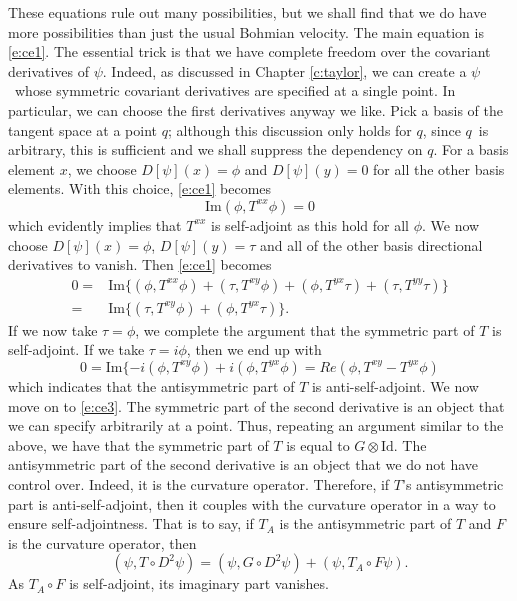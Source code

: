 \documentclass[11pt]{article}
\theoremstyle{remark}
\begin{document}
These equations  rule out many possibilities, but we shall find that
we do have more possibilities than just the usual Bohmian velocity.
The main equation is \eqref{e:ce1}. The essential trick is that we
have complete freedom over the covariant derivatives of \ensuremath{\psi}. Indeed,
as discussed in Chapter \ref{c:taylor}, we can create a \ensuremath{\psi}\ whose
symmetric covariant derivatives are specified at a single point. In
particular, we can choose the first derivatives anyway we like. Pick a
basis of the tangent space at a point \ensuremath{q}; although this discussion only
holds for \ensuremath{q}, since \ensuremath{q}\ is arbitrary, this is sufficient and
we shall suppress the dependency on \ensuremath{q}. 
For a basis element $x$, we 
choose $D [\ensuremath{\psi}] (x) = \phi$ and $D [\ensuremath{\psi}] (y) = 0$ for all the other basis
elements. With this choice, \eqref{e:ce1} becomes 
\[
\textrm{Im} \ensuremath{({\phi}, {T^{xx} \phi})} =0 
\]
which evidently implies that $T^{xx}$ is self-adjoint as this hold for
all $\phi$.
We now choose $D[ \ensuremath{\psi}] (x) = \phi$, $D[ \ensuremath{\psi}](y) =\tau$ and all of the other
basis directional derivatives to vanish. Then \eqref{e:ce1} becomes
\[
\begin{split}
0 =& \textrm{Im}\{ \ensuremath{({\phi}, {T^{xx} \phi})} + \ensuremath{({\tau}, {T^{xy} \phi})}+
\ensuremath{({\phi}, {T^{yx} \tau})} + \ensuremath{({\tau}, {T^{yy} \tau})}\}
\\=&
  \textrm{Im}\{ \ensuremath{({\tau}, {T^{xy} \phi})}+
\ensuremath{({\phi}, {T^{yx} \tau})}\}.
\end{split}
\] 
If we now take $\tau = \phi$, we complete the argument that the
 symmetric part of $T$ is self-adjoint. If we take $\tau = i\phi$,
 then we end up with
\[
0 =  \textrm{Im}\{-i \ensuremath{({\phi}, {T^{xy} \phi})}+
i\ensuremath{({\phi}, {T^{yx} \phi})}= Re \ensuremath{({\phi}, {T^{xy} - T^{yx}  \phi})}
\]
which indicates that the antisymmetric part of $T$ is anti-self-adjoint.
We now move on to \eqref{e:ce3}. The symmetric part of the second
derivative is an object that we can specify arbitrarily at a
point. Thus, repeating an argument  similar to the above, 
we have that the symmetric part of $T$ is equal to $G
\otimes \ensuremath{\text{Id}}$. The antisymmetric part of the second derivative is an
object that we do not have control over. Indeed, it is the curvature
operator. Therefore, if $T$'s antisymmetric part is anti-self-adjoint,
then it couples with the curvature operator in a way to ensure
self-adjointness. That is to say, if $T_A$ is the antisymmetric part of
$T$ and $F$ is the curvature operator, then  
\[
\ensuremath{({\ensuremath{\psi}}, {T\circ D^2 \ensuremath{\psi}})} = \ensuremath{({\ensuremath{\psi}}, {G \circ D^2 \ensuremath{\psi}})} +
\ensuremath{({\ensuremath{\psi}}, {T_A\circ F \ensuremath{\psi}})}.
\]
As $T_A \circ F$ is self-adjoint, its imaginary part vanishes. 
\end{document}

